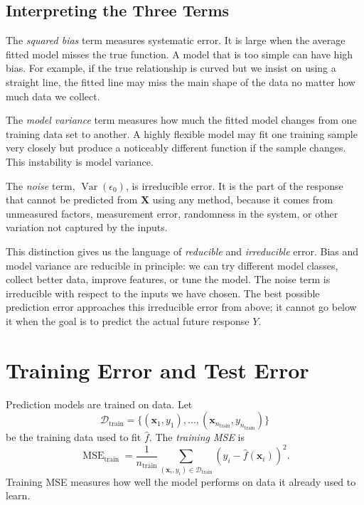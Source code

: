 {\subsection{Interpreting the Three Terms}

The \emph{squared bias} term measures systematic error.  It is large when the average fitted model misses the true function.  A model that is too simple can have high bias.  For example, if the true relationship is curved but we insist on using a straight line, the fitted line may miss the main shape of the data no matter how much data we collect.

The \emph{model variance} term measures how much the fitted model changes from one training data set to another.  A highly flexible model may fit one training sample very closely but produce a noticeably different function if the sample changes.  This instability is model variance.

The \emph{noise} term, $\operatorname{Var}(\epsilon_0)$, is irreducible error.  It is the part of the response that cannot be predicted from $\mathbf{X}$ using any method, because it comes from unmeasured factors, measurement error, randomness in the system, or other variation not captured by the inputs.

This distinction gives us the language of \emph{reducible} and \emph{irreducible} error.  Bias and model variance are reducible in principle: we can try different model classes, collect better data, improve features, or tune the model.  The noise term is irreducible with respect to the inputs we have chosen.  The best possible prediction error approaches this irreducible error from above; it cannot go below it when the goal is to predict the actual future response $Y$.

\section{Training Error and Test Error}

Prediction models are trained on data.  Let
\[
  \mathcal{D}_{\text{train}}
  = \{(\mathbf{x}_1,y_1),\ldots,(\mathbf{x}_{n_{\text{train}}},y_{n_{\text{train}}})\}
\]
be the training data used to fit $\hat f$.  The \emph{training MSE} is
\begin{equation}
  \operatorname{MSE}_{\text{train}}
  = \frac{1}{n_{\text{train}}}\sum_{(\mathbf{x}_i,y_i)\in \mathcal{D}_{\text{train}}}
  \left(y_i-\hat f(\mathbf{x}_i)\right)^2.
  \label{eq:ch2-training-mse}
\end{equation}
Training MSE measures how well the model performs on data it already used to learn.

}
